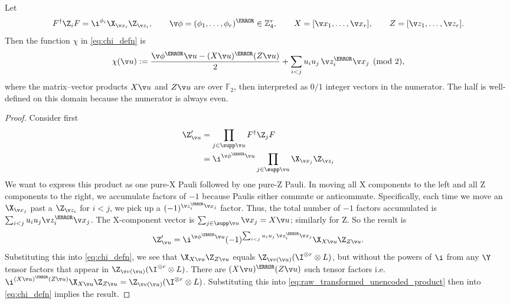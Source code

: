 \begin{lem}
\label{lem:trivial_syndrome_phase_evaluation}
Let
\[
F^\dag\Z_iF=\i^{\phi_i}\X_{\v x_i}\Z_{\v z_i},
\qquad
\v \phi=(\phi_1,\ldots,\phi_r)^\T\in\mathbb Z_4^r,
\qquad
X=[\v x_1,\ldots,\v x_r],
\qquad
Z=[\v z_1,\ldots,\v z_r].
\]
Then the function $\chi$ in \cref{eq:chi_defn} is
\begin{equation}
\chi(\v u)
:=
\frac{\v \phi^\T\v u-(X\v u)^\T(Z\v u)}2
+\sum_{i<j} u_i u_j\,\v z_i^\T\v x_j
\pmod 2,
\label{eq:chi_phase_formula}
\end{equation}
where the matrix--vector products $X\v u$ and $Z\v u$ are over $\mathbb{F}_2$,
then interpreted as $0/1$ integer vectors in the numerator.
The half is well-defined on this domain because
the numerator is always even.
\end{lem}
\begin{proof}
Consider first
\begin{align}
\Z_{\v u}'
&=\prod_{j \in \supp \v u} F^\dag \Z_j F \notag \\
&=\i^{\v \phi^\T \v u} \prod_{j \in \supp \v u}
\X_{\v x_j} \Z_{\v z_j}
\end{align}
We want to express this product
as one pure-X Pauli followed by one pure-Z Pauli.
In moving
all X components to the left and
all Z components to the right,
we accumulate factors of $-1$
because Paulis either commute or anticommute.
Specifically,
each time we move an $\X_{\v x_j}$
past a $\Z_{\v z_i}$ for $i <j$,
we pick up a $(-1)^{\v z_i^\T \v x_j}$ factor.
Thus,
the total number of $-1$ factors accumulated is
$\sum_{i <j} u_i u_j \v z_i^\T \v x_j$.
The X-component vector is $\sum_{j \in \supp \v u} \v x_j =X\v u$;
similarly for Z.
So the result is
\begin{equation}
\label{eq:raw_transformed_unencoded_product}
\Z'_{\v u}
=
\i^{\v \phi^\T\v u}
(-1)^{\sum_{i<j} u_i u_j\,\v z_i^\T\v x_j}
\X_{X\v u}\Z_{Z\v u}.
\end{equation}
Substituting this into \cref{eq:chi_defn},
we see that $\X_{X\v u}\Z_{Z\v u}$
equals $\Z_{\v v(\v u)}(\I^{\otimes r}\otimes L)$,
but without the powers of $\i$
from any $\Y$ tensor factors that appear in
$\Z_{\v v(\v u)}(\I^{\otimes r}\otimes L)$.
There are $(X\v u)^\T(Z\v u)$ such tensor factors
i.e.\ $\i^{(X\v u)^\T(Z\v u)} \X_{X\v u}\Z_{Z\v u}
=\Z_{\v v(\v u)}(\I^{\otimes r}\otimes L)$.
Substituting this into \cref{eq:raw_transformed_unencoded_product}
then into \cref{eq:chi_defn} implies the result.
\end{proof}
